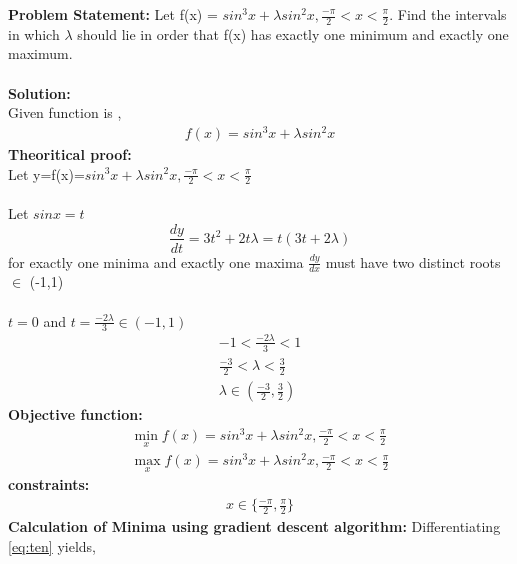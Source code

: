 \documentclass[10pt,a4paper]{report}
\begin{document}
\begin{multicols}{2}
\textbf{Problem Statement:}\vspace{2mm}
\justify Let f(x) = $sin^3 x+\lambda sin^2 x, \frac{-\pi}{2} < x < \frac{\pi}{2} $. Find the intervals in which $\lambda$ should lie in order that f(x) has exactly one minimum and exactly one maximum.
\\
\\
\vspace{4mm}
\textbf{Solution:}
\\
Given function is ,
	\begin{align}
	\label{eq:one}
	f(x)= sin^3 x+\lambda sin^2 x
	\end{align}
	\textbf{Theoritical proof:}
\vspace{4mm}
\\
Let y=f(x)=$sin^3 x+\lambda sin^2 x, \frac{-\pi}{2} < x < \frac{\pi}{2} $\\ \\
Let $sinx=t$
    \begin{equation}
	 \frac{dy}{dt}=3t^2+2t\lambda=t(3t+2\lambda)
	 \end{equation}
	 for exactly one minima and exactly one maxima  $\frac{dy}{dx} $ must have two distinct roots $\in$ (-1,1) \\ \\
	 \hspace*{2.2cm}$t=0$ and $t=\frac{-2\lambda}{3}\in (-1,1)$\\
	 \begin{align}
	 -1<\frac{-2\lambda}{3}<1\\
	 \frac{-3}{2}<\lambda<\frac{3}{2}\\
	 \lambda\in (\frac{-3}{2},\frac{3}{2})
	 \end{align}
	\textbf{Objective function:}
	\begin{align}
	\min_xf(x)= sin^3 x+\lambda sin^2 x, \frac{-\pi}{2} < x < \frac{\pi}{2} \\
	\max_xf(x)= sin^3 x+\lambda sin^2 x, \frac{-\pi}{2} < x < \frac{\pi}{2} 
        \end{align}
	\textbf{constraints:}\\
	\begin{align}
		x \in \{ \frac{-\pi}{2}, \frac{\pi}{2}\} 
	\end{align}
\textbf{Calculation of Minima using gradient descent algorithm:}
Differentiating \eqref{eq:ten} yields,
\begin{align}

\end{align}
\end{multicols}
\end{document}

